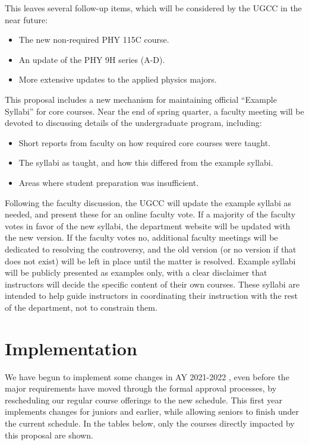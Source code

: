 \documentclass[12pt]{article}
\begin{document}
This leaves several follow-up items, which will be considered by the UGCC in the near future:
\begin{itemize}
 \item The new non-required PHY 115C course.
 \item An update of the PHY 9H series (A-D).
 \item More extensive updates to the applied physics majors.
\end{itemize}
This proposal includes a new mechanism for maintaining official
``Example Syllabi'' for core courses.  Near the end of spring quarter,
a faculty meeting will be devoted to discussing details of the
undergraduate program, including:
\begin{itemize} 
 \item Short reports from faculty on how required core courses were taught.
 \item The syllabi as taught, and how this differed from the example syllabi.
 \item Areas where student preparation was insufficient.
\end{itemize}
Following the faculty discussion, the UGCC will update the example
syllabi as needed, and present these for an online faculty vote.  If a
majority of the faculty votes in favor of the new syllabi, the
department website will be updated with the new version.  If the
faculty votes no, additional faculty meetings will be dedicated to
resolving the controversy, and the old version (or no version if that
does not exist) will be left in place until the matter is resolved.
Example syllabi will be publicly presented as examples only, with a
clear disclaimer that instructors will decide the specific content of
their own courses.  These syllabi are intended to help guide
instructors in coordinating their instruction with the rest of the
department, not to constrain them.

\section{Implementation}
\label{sec:implementation}

We have begun to implement some changes in AY 2021-2022 , even before
the major requirements have moved through the formal approval
processes, by rescheduling our regular course offerings to the new
schedule.  This first year implements changes for juniors and
earlier, while allowing seniors to finish under the current schedule.
In the tables below, only the courses directly impacted by this
proposal are shown.
\end{document}
